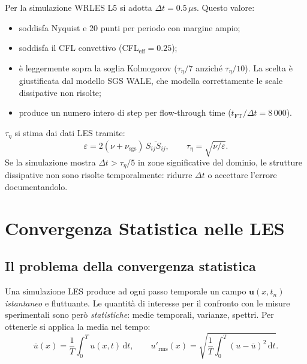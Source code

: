 \documentclass[11pt,a4paper]{article}
\newcommand{\mus}{\,\mu\mathrm{s}}
\newcommand{\tFT}{t_{\mathrm{FT}}}
\begin{document}
Per la simulazione WRLES L5 si adotta $\Delta t = 0.5\mus$. Questo
valore:
\begin{itemize}
  \item soddisfa Nyquist e 20 punti per periodo con margine ampio;
  \item soddisfa il CFL convettivo (CFL$_{\mathrm{eff}} = 0.25$);
  \item è leggermente sopra la soglia Kolmogorov ($\tau_\eta/7$ anziché
    $\tau_\eta/10$). La scelta è giustificata dal modello SGS WALE,
    che modella correttamente le scale dissipative non risolte;
  \item produce un numero intero di step per flow-through time
    ($\tFT/\Delta t = 8\,000$).
\end{itemize}

\begin{tipbox}
$\tau_\eta$ si stima dai dati LES tramite:
\[
  \varepsilon = 2(\nu+\nu_{\mathrm{sgs}})\,\overline{S_{ij}S_{ij}},
  \qquad \tau_\eta = \sqrt{\nu/\varepsilon}.
\]
Se la simulazione mostra $\Delta t > \tau_\eta/5$ in zone significative
del dominio, le strutture dissipative non sono risolte temporalmente:
ridurre $\Delta t$ o accettare l'errore documentandolo.
\end{tipbox}

\section{Convergenza Statistica nelle LES}
\label{sec:statistical}

\subsection{Il problema della convergenza statistica}

Una simulazione LES produce ad ogni passo temporale un campo
$\mathbf{u}(x,t_n)$ \emph{istantaneo} e fluttuante. Le quantità di
interesse per il confronto con le misure sperimentali sono però
\emph{statistiche}: medie temporali, varianze, spettri. Per ottenerle
si applica la media nel tempo:
\begin{equation}
  \bar u(x) = \frac{1}{T}\int_0^T u(x,t)\,\mathrm{d}t,
  \qquad
  u'_{\mathrm{rms}}(x) = \sqrt{\frac{1}{T}\int_0^T (u-\bar u)^2\,\mathrm{d}t}.
\end{equation}
\end{document}
